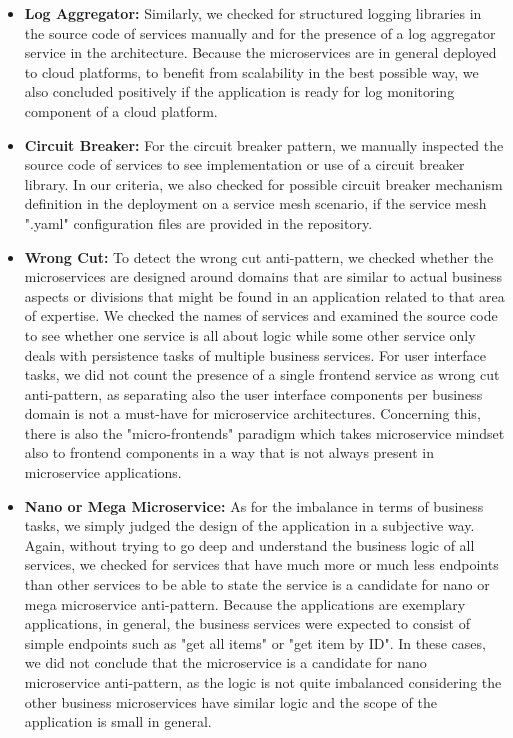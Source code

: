 \documentclass{Configuration_Files/PoliMi3i_thesis}
\begin{document}
\begin{itemize}
    \item \textbf{Log Aggregator:} Similarly, we checked for structured logging libraries in the source code of services manually and for the presence of a log aggregator service in the architecture.
    Because the microservices are in general deployed to cloud platforms, to benefit from scalability in the best possible way, we also concluded positively if the application is ready for log monitoring component of a cloud platform.
    
    \item \textbf{Circuit Breaker:} For the circuit breaker pattern, we manually inspected the source code of services to see implementation or use of a circuit breaker library.
    In our criteria, we also checked for possible circuit breaker mechanism definition in the deployment on a service mesh scenario, if the service mesh ".yaml" configuration files are provided in the repository.
    
    \item \textbf{Wrong Cut:} To detect the wrong cut anti-pattern, we checked whether the microservices are designed around domains that are similar to actual business aspects or divisions that might be found in an application related to that area of expertise.
    We checked the names of services and examined the source code to see whether one service is all about logic while some other service only deals with persistence tasks of multiple business services.
    For user interface tasks, we did not count the presence of a single frontend service as wrong cut anti-pattern, as separating also the user interface components per business domain is not a must-have for microservice architectures.
    Concerning this, there is also the "micro-frontends"\footnotemark[62] paradigm which takes microservice mindset also to frontend components in a way that is not always present in microservice applications.
    
    \item \textbf{Nano or Mega Microservice:} As for the imbalance in terms of business tasks, we simply judged the design of the application in a subjective way.
    Again, without trying to go deep and understand the business logic of all services, we checked for services that have much more or much less endpoints than other services to be able to state the service is a candidate for nano or mega microservice anti-pattern.
    Because the applications are exemplary applications, in general, the business services were expected to consist of simple endpoints such as "get all items" or "get item by ID".
    In these cases, we did not conclude that the microservice is a candidate for nano microservice anti-pattern, as the logic is not quite imbalanced considering the other business microservices have similar logic and the scope of the application is small in general.
    

\end{itemize}
\end{document}
